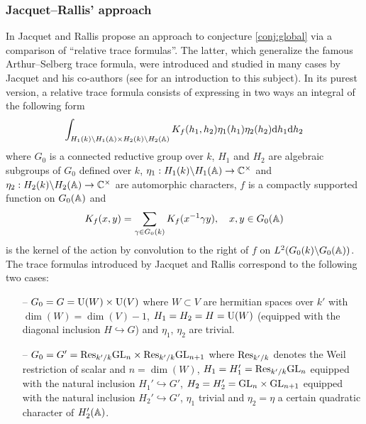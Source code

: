 \subsubsection{Jacquet--Rallis' approach}
In \cite{jacquet2011gross} Jacquet and Rallis propose an approach to conjecture \ref{conj:global} via a comparison of ``relative trace formulas''.
The latter, which generalize the famous Arthur--Selberg trace formula, were introduced and studied in many cases by Jacquet and his co-authors (see \cite{lapid2006relative} for an introduction to this subject).
In its purest version, a relative trace formula consists of expressing in two ways an integral of the following form
\begin{equation}
\label{eqn:8}
    \int_{H_1(k) \backslash H_1(\mathbb{A}) \times H_2(k) \backslash H_2(\mathbb{A})} K_f(h_1, h_2)\eta_1(h_1) \eta_2(h_2) \mathrm{d} h_1 \mathrm{d} h_2
\end{equation}
where $G_0$ is a connected reductive group over $k$, $H_1$ and $H_2$ are algebraic subgroups of $G_0$ defined over $k$, $\eta_1: H_1(k) \backslash H_1(\mathbb{A}) \to \mathbb{C}^\times$ and $\eta_2: H_2(k) \backslash H_2(\mathbb{A}) \to \mathbb{C}^\times$ are automorphic characters, $f$ is a compactly supported function on $G_0(\mathbb{A})$ and
\[
    K_f(x, y) = \sum_{\gamma \in G_0(k)} K_f(x^{-1} \gamma y), \quad x,  y \in G_0(\mathbb{A})
\]
is  the kernel of the action by convolution to the right of $f$ on $L^2(G_0(k) \backslash G_0(\mathbb{A}))$.
The trace formulas introduced by Jacquet and Rallis correspond to the following two cases:

\begin{itemize}
    \item[--] $G_0 = G = \mathrm{U}(W) \times \mathrm{U}(V)$ where $W \subset V$ are hermitian spaces over $k'$ with $\dim(W) = \dim(V) - 1$, $H_1 = H_2 = H = \mathrm{U}(W)$ (equipped with the diagonal inclusion $H \hookrightarrow G$) and $\eta_1$, $\eta_2$ are trivial.
    \item[--] $G_0 = G' = \mathrm{Res}_{k'/k} \mathrm{GL}_n \times \mathrm{Res}_{k'/k} \mathrm{GL}_{n+1}$ where $\mathrm{Res}_{k'/k}$ denotes the Weil restriction of scalar and $n = \dim(W)$, $H_1 = H_1' = \mathrm{Res}_{k'/k} \mathrm{GL}_n$ equipped with the natural inclusion $H_1' \hookrightarrow G'$, $H_2 = H_2' = \mathrm{GL}_n \times \mathrm{GL}_{n+1}$ equipped with the natural inclusion $H_2' \hookrightarrow G'$, $\eta_1$ trivial and $\eta_2 = \eta$ a certain quadratic character of $H_2'(\mathbb{A})$.
\end{itemize}


